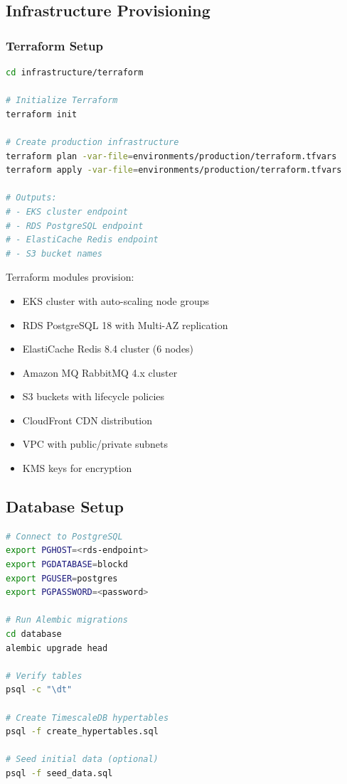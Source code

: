 \documentclass[11pt,letterpaper]{article}
\begin{document}
\subsection{Infrastructure Provisioning}

\subsubsection{Terraform Setup}

\begin{lstlisting}[language=bash, caption=Provision Infrastructure with Terraform]
cd infrastructure/terraform

# Initialize Terraform
terraform init

# Create production infrastructure
terraform plan -var-file=environments/production/terraform.tfvars
terraform apply -var-file=environments/production/terraform.tfvars

# Outputs:
# - EKS cluster endpoint
# - RDS PostgreSQL endpoint
# - ElastiCache Redis endpoint
# - S3 bucket names
\end{lstlisting}

Terraform modules provision:
\begin{itemize}[noitemsep]
    \item EKS cluster with auto-scaling node groups
    \item RDS PostgreSQL 18 with Multi-AZ replication
    \item ElastiCache Redis 8.4 cluster (6 nodes)
    \item Amazon MQ RabbitMQ 4.x cluster
    \item S3 buckets with lifecycle policies
    \item CloudFront CDN distribution
    \item VPC with public/private subnets
    \item KMS keys for encryption
\end{itemize}

\subsection{Database Setup}

\begin{lstlisting}[language=bash, caption=Database Migration]
# Connect to PostgreSQL
export PGHOST=<rds-endpoint>
export PGDATABASE=blockd
export PGUSER=postgres
export PGPASSWORD=<password>

# Run Alembic migrations
cd database
alembic upgrade head

# Verify tables
psql -c "\dt"

# Create TimescaleDB hypertables
psql -f create_hypertables.sql

# Seed initial data (optional)
psql -f seed_data.sql
\end{lstlisting}
\end{document}
